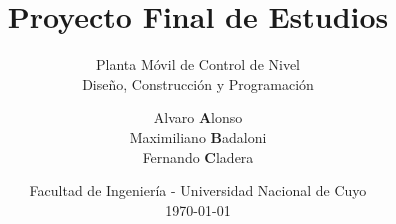 
\title[{\makebox[.5\paperwidth]{PFE: Planta Móvil de Control de Nivel\hfill%
       \insertframenumber/\inserttotalframenumber}}]{Proyecto Final de Estudios}

\subtitle{Planta Móvil de Control de Nivel\\Diseño, Construcción y
Programación}
\author{\texorpdfstring{Alvaro \textbf{A}lonso\\
			Maximiliano \textbf{B}adaloni\\
			Fernando \textbf{C}ladera}
			{Alonso Badaloni Cladera}
	}


\date{
  \scriptsize Facultad de Ingeniería - Universidad Nacional de Cuyo
  \\
  \vspace{.10cm}
  \today
  \ifdebug
  \fi
}

